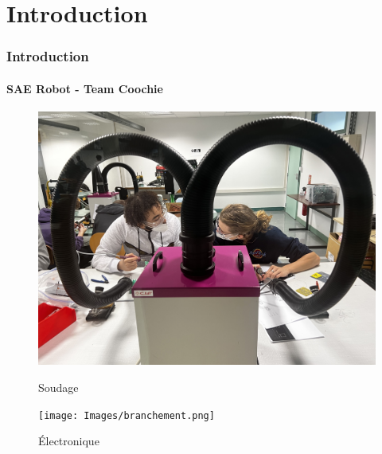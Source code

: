\section{Introduction}

\begin{frame}
\frametitle{Introduction}
\framesubtitle{SAE Robot - Team Coochie}

    \begin{figure}[H]
        \centering
        \begin{minipage}{.5\textwidth}
            \centering
            \includegraphics[width=.7\linewidth]{Images/soudage.jpeg}
            \caption{ Soudage}
            \label{fig:soudage}
        \end{minipage}%
        \begin{minipage}{.5\textwidth}
            \centering
            \texttt{[image: Images/branchement.png]}
            \caption{Électronique}
        \label{fig:branchements}
        \end{minipage}
    \end{figure}

\footer{\hfill\insertframenumber/\inserttotalframenumber}
\end{frame}